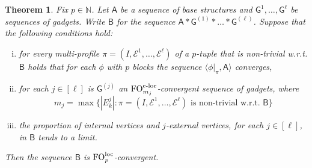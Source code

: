 \documentclass[11pt]{article}
\theoremstyle{plain}
\newtheorem{theorem}{Theorem}[section]
\theoremstyle{definition}
\theoremstyle{remark}
\newcommand{\N}{\mathbb{N}}
\DeclareMathOperator\FO{FO}
\newcommand{\FOloc}[1]{\FO_{#1}^\textnormal{loc}}
\newcommand{\FOcloc}[1]{\FO_{#1}^{\textnormal{c-loc}}}
\newcommand{\stonepar}[2]{\langle #1, #2 \rangle}
\newcommand{\strseq}[1]{{\boldsymbol{\mathsf{#1}}}}
\begin{document}
\begin{theorem}\label{thm:local_multiple_gadgets}
    Fix $p \in \N$.
    Let $\strseq{A}$ be a sequence of base structures and $\strseq{G}^{1}, \dots, \strseq{G}^{\ell}$ be sequences of gadgets.
    Write $\strseq{B}$ for the sequence $\strseq{A}*\strseq{G}^{(1)} * \dots *\strseq{G}^{(\ell)}$.
    Suppose that the following conditions hold:
    \begin{enumerate}[(i)]
        \item for every multi-profile $\pi = (I, \mathcal{E}^1, \dots, \mathcal{E}^\ell)$ of a $p$-tuple that is non-trivial w.r.t. $\strseq{B}$ holds that for each $\phi$ with $p$ blocks the sequence $\stonepar{\phi|_\pi}{\strseq{A}}$ converges,
        \item for each $j \in [\ell]$ is $\strseq{G}^{(j)}$ an $\FOcloc{m_j}$-convergent sequence of gadgets, where
        \[
            m_j = \max \{ |E^j_k| : \pi = (I, \mathcal{E}^1, \dots, \mathcal{E}^\ell) \text{ is non-trivial w.r.t. } \strseq{B} \}
        \]
        \item the proportion of internal vertices and $j$-external vertices, for each $j \in [\ell]$, in $\strseq{B}$ tends to a limit.
    \end{enumerate}
    Then the sequence $\strseq{B}$ is $\FOloc{p}$-convergent.
\end{theorem}
\end{document}
